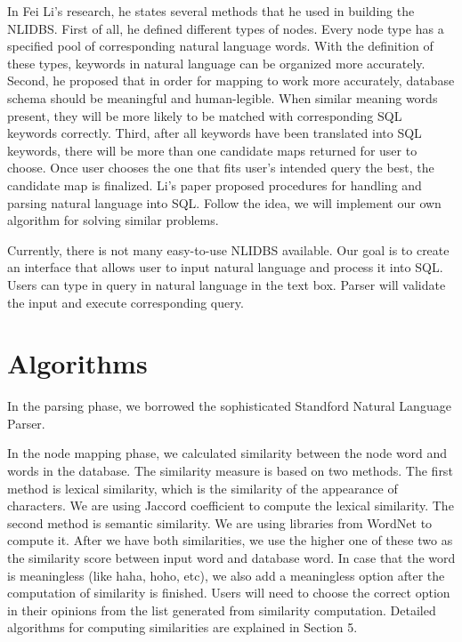 \documentclass[twocolumn]{article}
\begin{document}
In Fei Li’s research, he states several methods that he used in building the NLIDBS. First of all, he defined different types of nodes. Every node type has a specified pool of corresponding natural language words. With the definition of these types, keywords in natural language can be organized more accurately. Second, he proposed that in order for mapping to work more accurately, database schema should be meaningful and human-legible. When similar meaning words present, they will be more likely to be matched with corresponding SQL keywords correctly. Third, after all keywords have been translated into SQL keywords, there will be more than one candidate maps returned for user to choose. Once user chooses the one that fits user’s intended query the best, the candidate map is finalized. Li’s paper proposed procedures for handling and parsing natural language into SQL.\cite{li2014} Follow the idea, we will implement our own algorithm for solving similar problems.

Currently, there is not many easy-to-use NLIDBS available. Our goal is to create an interface that allows user to input natural language and process it into SQL. Users can type in query in natural language in the text box. Parser will validate the input and execute corresponding query.


\section{Algorithms}
In the parsing phase, we borrowed the sophisticated Standford Natural Language Parser. 

In the node mapping phase, we calculated similarity between the node word and words in the database. The similarity measure is based on two methods. The first method is lexical similarity, which is the similarity of the appearance of characters. We are using Jaccord coefficient to compute the lexical similarity. The second method is semantic similarity. We are using libraries from WordNet to compute it. After we have both similarities, we use the higher one of these two as the similarity score between input word and database word. In case that the word is meaningless (like haha, hoho, etc), we also add a meaningless option after the computation of similarity is finished. Users will need to choose the correct option in their opinions from the list generated from similarity computation. Detailed algorithms for computing similarities are explained in Section 5.
\end{document}
